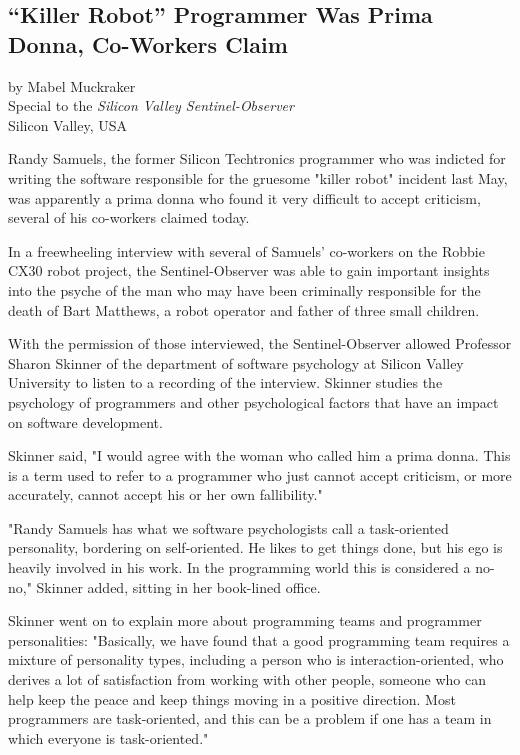 \begin{center}
\section*{``Killer Robot'' Programmer Was Prima Donna, Co-Workers Claim}
by Mabel Muckraker\\
Special to the \textit{Silicon Valley Sentinel-Observer}\\
Silicon Valley, USA
\end{center}
Randy Samuels, the former Silicon Techtronics programmer who was indicted for writing the software responsible for the gruesome "killer robot" incident last May, was apparently a prima donna who found it very difficult to accept criticism, several of his co-workers claimed today.

In a freewheeling interview with several of Samuels' co-workers on the Robbie CX30 robot project, the Sentinel-Observer was able to gain important insights into the psyche of the man who may have been criminally responsible for the death of Bart Matthews, a robot operator and father of three small children.

With the permission of those interviewed, the Sentinel-Observer allowed Professor Sharon Skinner of the department of software psychology at Silicon Valley University to listen to a recording of the interview. Skinner studies the psychology of programmers and other psychological factors that have an impact on software development.

Skinner said, "I would agree with the woman who called him a prima donna. This is a term used to refer to a programmer who just cannot accept criticism, or more accurately, cannot accept his or her own fallibility."

"Randy Samuels has what we software psychologists call a task-oriented personality, bordering on self-oriented. He likes to get things done, but his ego is heavily involved in his work. In the programming world this is considered a no-no," Skinner added, sitting in her book-lined office.

Skinner went on to explain more about programming teams and programmer personalities: "Basically, we have found that a good programming team requires a mixture of personality types, including a person who is interaction-oriented, who derives a lot of satisfaction from working with other people, someone who can help keep the peace and keep things moving in a positive direction. Most programmers are task-oriented, and this can be a problem if one has a team in which everyone is task-oriented."

